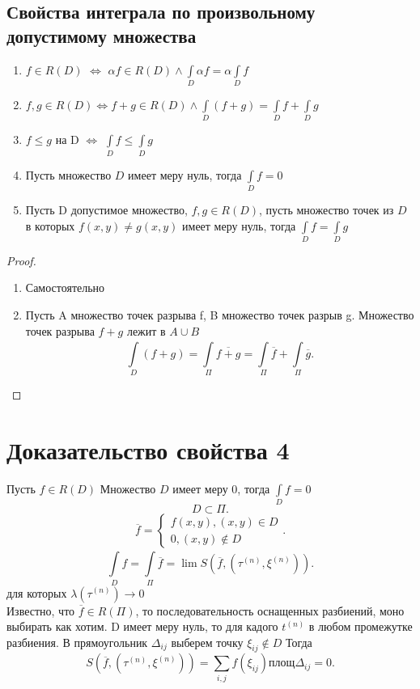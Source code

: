 \documentclass[14pt]{extarticle} \usepackage{fontspec}
\begin{document}
\subsection{Свойства интеграла по произвольному допустимому множества}
\begin{enumerate}
    \item $f \in R(D)$   $\iff$  $\alpha f \in R(D) \land \int\limits_{D}^{} \alpha f = \alpha \int\limits_{D}^{} f  $
     \item $f,g \in R(D) \iff f + g \in R(D) \land \int\limits_{D}^{} (f+g) = \int\limits_{D}^{} f + \int\limits_{D}^{} g   $
     \item $f \le g $ на D $\iff$  $\int\limits_{D}^{} f \le  \int\limits_{D}^{} g  $
    \item Пусть множество $D$ имеет меру нуль, тогда  $\int\limits_{D}^{} f = 0 $
    \item Пусть D допустимое множество, $f,g \in R(D)$, пусть множество точек из  $D$ в которых  $f(x,y) \neq g(x,y)$ имеет меру нуль, тогда $\int\limits_{D}^{} f = \int\limits_{D}^{} g  $
\end{enumerate}
\begin{proof}
    \begin{enumerate}
        \item Самостоятельно
        \item Пусть A множество точек разрыва f, B множество точек разрыв g. Множество точек разрыва $f+g$ лежит в  $A \cup B$
            \[
            \int\limits_{D}^{}   (f + g) = \int\limits_{\Pi}^{}  \overline{f + g} = 
            \int\limits_{\Pi}^{}   \overline{f} + \int\limits_{\Pi}^{}   \overline{g}
            .\] 
    \end{enumerate}
\end{proof}

    \section{Доказательство свойства 4}
    Пусть $f \in R(D)$ Множество $D$ имеет меру 0, тогда  $\int\limits_{D}^{} f = 0 $ \\
    \[
    D \subset \Pi
    .\] 
    \[
    \overline{f} = 
    \begin{cases}
        f(x,y) , (x,y) \in D \\
        0, (x,y) \notin D
    \end{cases}
    .\] 
    \[
    \int\limits_{D}^{} f = \int\limits_{\Pi}^{} \overline{f}   =  \lim S(\overline{f},(\tau^{(n)},\xi^{(n)}))
    .\] 
    для которых  $\lambda(\tau^{(n)}) \to 0$\\
    Известно, что $\overline{f} \in R(\Pi)$, то последовательность оснащенных разбиений, моно выбирать как хотим. D имеет меру нуль, то для кадого $t^{(n)}$ в любом промежутке разбиения. В прямоугольник $\varDelta_{ij}$ выберем точку $\xi_{ij} \notin D$ Тогда
    \[
        S(\overline{f},(\tau^{(n)},\xi^{(n)})) = \sum_{i,j} f(\xi_{ij}) \text{площ} \varDelta_{ij} = 0
    .\] 
\end{document}
